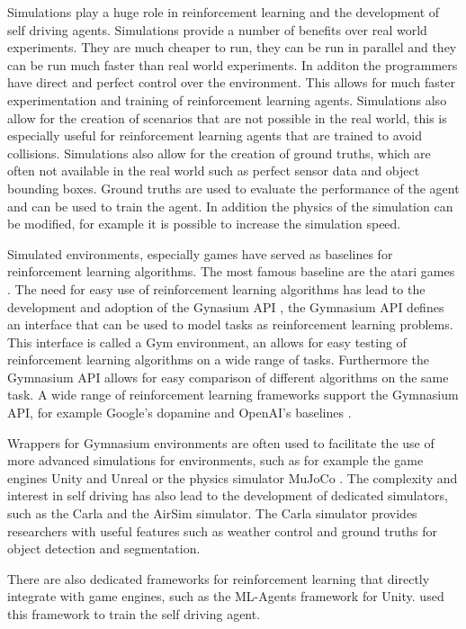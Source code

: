 Simulations play a huge role in reinforcement learning and the development of self driving agents. Simulations provide a number of benefits over real world experiments. They are much cheaper to run, they can be run in parallel and they can be run much faster than real world experiments. In additon the programmers have direct and perfect control over the environment. This allows for much faster experimentation and training of reinforcement learning agents. Simulations also allow for the creation of scenarios that are not possible in the real world, this is especially useful for reinforcement learning agents that are trained to avoid collisions. Simulations also allow for the creation of ground truths, which are often not available in the real world such as perfect sensor data and object bounding boxes. Ground truths are used to evaluate the performance of the agent and can be used to train the agent. In addition the physics of the simulation can be modified, for example it is possible to increase the simulation speed.

Simulated environments, especially games have served as baselines for reinforcement learning algorithms. The most famous baseline are the atari games \autocite{atari}. The need for easy use of reinforcement learning algorithms has lead to the development and adoption of the Gynasium API \autocite{gymnasium}, the Gymnasium API defines an interface that can be used to model tasks as reinforcement learning problems. This interface is called a Gym environment, an allows for easy testing of reinforcement learning algorithms on a wide range of tasks. Furthermore the Gymnasium API allows for easy comparison of different algorithms on the same task. A wide range of reinforcement learning frameworks support the Gymnasium API, for example Google's dopamine \autocite{dopamine} and OpenAI's baselines \autocite{sb3}.

Wrappers for Gymnasium environments are often used to facilitate the use of more advanced simulations for environments, such as for example the game engines Unity and Unreal or the physics simulator MuJoCo \autocite{mujoco}. The complexity and interest in self driving has also lead to the development of dedicated simulators, such as the Carla \autocite{carla} and the AirSim \autocite{airsim} simulator. The Carla simulator provides researchers with useful features such as weather control and ground truths for object detection and segmentation.

There are also dedicated frameworks for reinforcement learning that directly integrate with game engines, such as the ML-Agents framework \autocite{mlagents} for Unity.\autocite{maximilian} used this framework to train the self driving agent.

